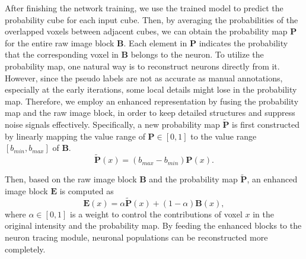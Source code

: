After finishing the network training, we use the trained model to predict the probability cube for each input cube.
Then, by averaging the probabilities of the overlapped voxels between adjacent cubes, we can obtain the probability map $\mathbf{P}$ for the entire raw image block $ \mathbf{B} $.
Each element in $\mathbf{P}$ indicates the probability that the corresponding voxel in $ \mathbf{B} $ belongs to the neuron.
To utilize the probability map, one natural way is to reconstruct neurons directly from it.
However, since the pseudo labels are not as accurate as manual annotations, 
especially at the early iterations, some local details might lose in the probability map. Therefore, we employ an enhanced representation by fusing the probability map and the raw image block, in order to keep detailed structures and suppress noise signals effectively.
Specifically, a new probability map $\widetilde{\mathbf{P}} $ is first constructed by linearly mapping the value range of $ \mathbf{P}\in [0,1] $ to the value range $[{b}_{min}, {b}_{max}]$ of $\mathbf{B}$.
\begin{equation}
\widetilde{\mathbf{P}}(x) = ({b}_{max}-{b}_{min})\mathbf{P}(x).
\end{equation}


Then, based on the raw image block $\mathbf{B}$ and the probability map $\widetilde{\mathbf{P}}$, an enhanced image block $\mathbf{E}$ is computed as
\begin{equation}
\mathbf{E}(x) = \alpha\widetilde{\mathbf{P}}(x) + (1-\alpha)\mathbf{B}(x),
\label{equ: enhance}
\end{equation}
where $\alpha\in [0,1]$ is a weight to control the contributions of voxel $ x $ in the original intensity and the probability map. By feeding the enhanced blocks to the neuron tracing module, neuronal populations can be reconstructed more completely.


